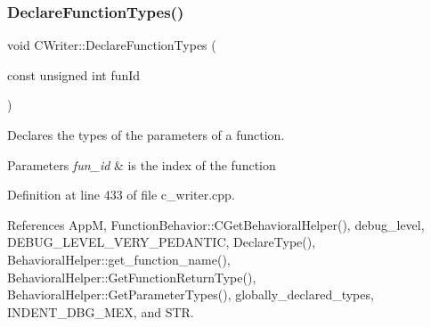 \subsubsection{\texorpdfstring{Declare\+Function\+Types()}{DeclareFunctionTypes()}}
{\footnotesize\ttfamily void C\+Writer\+::\+Declare\+Function\+Types (\begin{DoxyParamCaption}\item[{const unsigned int}]{fun\+Id }\end{DoxyParamCaption})\hspace{0.3cm}{\ttfamily [virtual]}}



Declares the types of the parameters of a function. 


\begin{DoxyParams}{Parameters}
{\em fun\+\_\+id} & is the index of the function \\
\hline
\end{DoxyParams}


Definition at line 433 of file c\+\_\+writer.\+cpp.



References AppM, Function\+Behavior\+::\+C\+Get\+Behavioral\+Helper(), debug\+\_\+level, D\+E\+B\+U\+G\+\_\+\+L\+E\+V\+E\+L\+\_\+\+V\+E\+R\+Y\+\_\+\+P\+E\+D\+A\+N\+T\+IC, Declare\+Type(), Behavioral\+Helper\+::get\+\_\+function\+\_\+name(), Behavioral\+Helper\+::\+Get\+Function\+Return\+Type(), Behavioral\+Helper\+::\+Get\+Parameter\+Types(), globally\+\_\+declared\+\_\+types, I\+N\+D\+E\+N\+T\+\_\+\+D\+B\+G\+\_\+\+M\+EX, and S\+TR.


